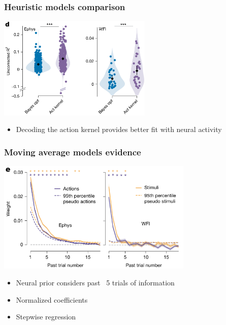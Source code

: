 \documentclass{beamer}
\begin{document}
\begin{frame}
  \frametitle{Heuristic models comparison}
  \begin{center}
    \includegraphics[width=0.55\textwidth, keepaspectratio]{./figure4d}
  \end{center}
  \begin{itemize}
    \item Decoding the action kernel provides better fit with neural activity
  \end{itemize}
\end{frame}

\begin{frame}
  \frametitle{Moving average models evidence}
  \begin{center}
    \includegraphics[width=0.7\textwidth, keepaspectratio]{./figure4e}
  \end{center}
  \begin{itemize}
    \item Neural prior considers past ~5 trials of information
    \item Normalized coefficients
    \item Stepwise regression
  \end{itemize}
\end{frame}
\end{document}
